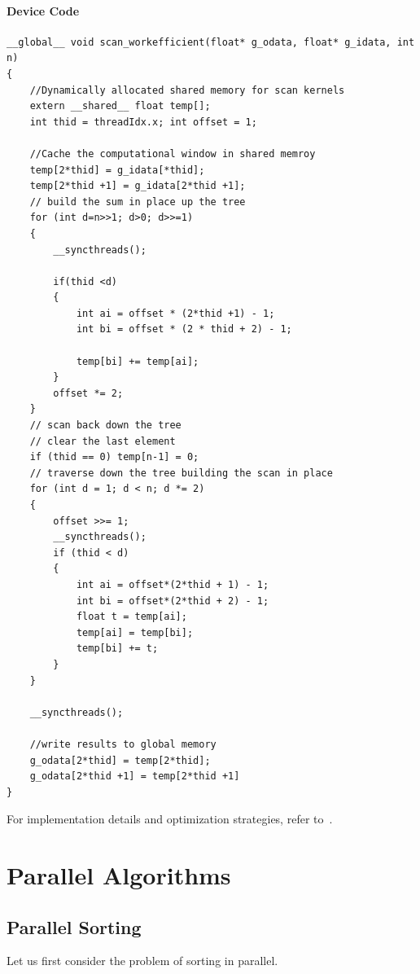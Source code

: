 \documentclass[12pt]{book}
\begin{document}
\subsubsection*{Device Code}
\begin{lstlisting}[style=cppstyle]
__global__ void scan_workefficient(float* g_odata, float* g_idata, int n)
{
    //Dynamically allocated shared memory for scan kernels
    extern __shared__ float temp[];
    int thid = threadIdx.x; int offset = 1;

    //Cache the computational window in shared memroy
    temp[2*thid] = g_idata[*thid];
    temp[2*thid +1] = g_idata[2*thid +1];
    // build the sum in place up the tree
    for (int d=n>>1; d>0; d>>=1)
    {
        __syncthreads();
    
        if(thid <d)
        {
            int ai = offset * (2*thid +1) - 1;
            int bi = offset * (2 * thid + 2) - 1;

            temp[bi] += temp[ai];
        }
        offset *= 2;
    }
    // scan back down the tree
    // clear the last element
    if (thid == 0) temp[n-1] = 0;
    // traverse down the tree building the scan in place
    for (int d = 1; d < n; d *= 2)
    {
        offset >>= 1;
        __syncthreads();
        if (thid < d)
        {
            int ai = offset*(2*thid + 1) - 1;
            int bi = offset*(2*thid + 2) - 1;
            float t = temp[ai];
            temp[ai] = temp[bi];
            temp[bi] += t;
        }
    }

    __syncthreads();

    //write results to global memory
    g_odata[2*thid] = temp[2*thid];
    g_odata[2*thid +1] = temp[2*thid +1]
}
\end{lstlisting}



For implementation details and optimization strategies, refer to~\cite{nvidia2011nvidia}.



\chapter{Parallel Algorithms}

\section{Parallel Sorting}

Let us first consider the problem of sorting in parallel.
\end{document}
